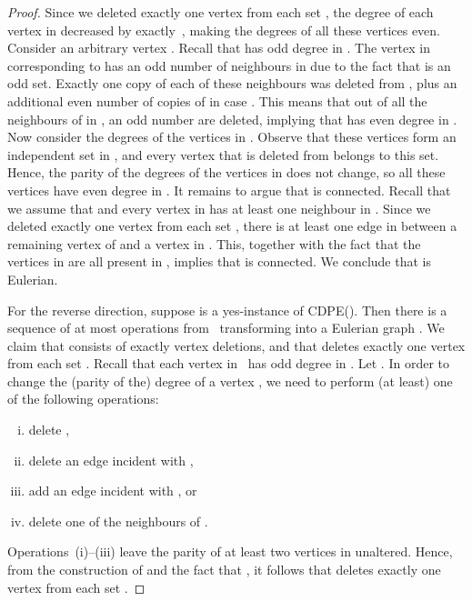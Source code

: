 \documentclass[11pt]{llncs}
\newcommand{\cdpe}{{\sc CDPE}}
\begin{document}
\begin{proof}
Since we deleted exactly one vertex from each set , the degree of
each vertex in  decreased by exactly~, making the degrees of all
these vertices even. Consider an arbitrary vertex . Recall
that  has odd degree in . The vertex in  corresponding to  has an
odd number of neighbours in  due to the fact that  is an odd set. Exactly
one copy of each of these neighbours was deleted from , plus an additional
even number of copies of  in case . This means that out of all the
neighbours of  in , an odd number are deleted, implying that  has
even degree in . Now consider the degrees of the vertices in . Observe that these vertices form an independent set in
, and every vertex that is deleted from  belongs to this set. Hence,
the parity of the degrees of the vertices in  does
not change, so all these vertices have even degree in . It remains to argue
that  is connected. Recall that we assume that  and every
vertex in  has at least one neighbour in . Since we deleted
exactly one vertex from each set , there is at least one edge in
 between a remaining vertex of  and a vertex in .
This, together with the fact that the vertices in 
are all present in , implies that  is connected. We conclude that 
is Eulerian.

\begin{sloppypar}
For the reverse direction, suppose  is a yes-instance of
\cdpe(). Then there is a sequence  of at most  operations from~
transforming  into a Eulerian graph . We claim that  consists of
exactly  vertex deletions, and that  deletes exactly one vertex from each
set . Recall that each vertex in~ has odd degree in
. 
Let . In order to change the (parity of the) degree of a
vertex , we need to perform (at least) one of the following operations:
\end{sloppypar}
\begin{enumerate}[(i)]
\renewcommand{\theenumi}{(\roman{enumi})}
\renewcommand\labelenumi{\theenumi}
\item delete , 
\item delete an edge incident with , 
\item add an edge incident with , or 
\item delete one of the neighbours of . 
\end{enumerate}
Operations~(i)--(iii) 
leave the parity of at least two vertices in  unaltered.
Hence, from the construction of  and the fact that , it follows
that  deletes exactly one vertex from each set .


\end{proof}
\end{document}
